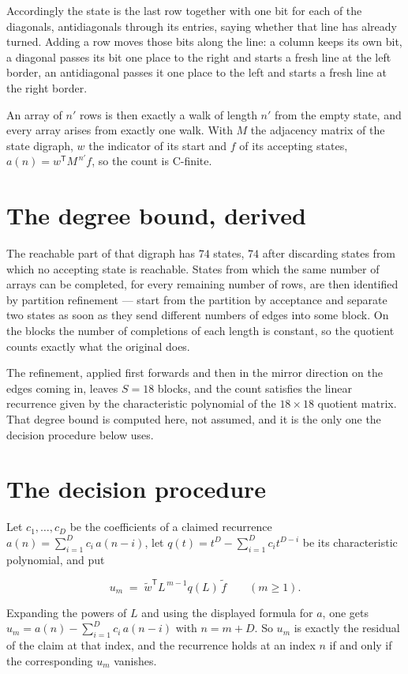 \documentclass[11pt]{article}
\theoremstyle{definition}
\begin{document}
Accordingly the state is the last row together with one bit for each of the diagonals, antidiagonals through its entries, saying whether that line has already turned. Adding a row moves those bits along the line: a column keeps its own bit, a diagonal passes its bit one place to the right and starts a fresh line at the left border, an antidiagonal passes it one place to the left and starts a fresh line at the right border.

An array of $n'$ rows is then exactly a walk of length $n'$ from the empty state, and every array arises from exactly one walk. With $M$ the adjacency matrix of the state digraph, $w$ the indicator of its start and $f$ of its accepting states, $a(n) = w^{\mathsf T}M^{\,n'}f$, so the count is C-finite.

\section{The degree bound, derived}

The reachable part of that digraph has $74$ states, $74$ after discarding states from which no accepting state is reachable. States from which the same number of arrays can be completed, for every remaining number of rows, are then identified by partition refinement --- start from the partition by acceptance and separate two states as soon as they send different numbers of edges into some block. On the blocks the number of completions of each length is constant, so the quotient counts exactly what the original does.

The refinement, applied first forwards and then in the mirror direction on the edges coming in, leaves $S = 18$ blocks, and the count satisfies the linear recurrence given by the characteristic polynomial of the $18 \times 18$ quotient matrix. That degree bound is computed here, not assumed, and it is the only one the decision procedure below uses.

\section{The decision procedure}

Let $c_1,\dots,c_D$ be the coefficients of a claimed recurrence $a(n) = \sum_{i=1}^{D} c_i\,a(n-i)$, let $q(t) = t^{D} - \sum_{i=1}^{D} c_i t^{D-i}$ be its characteristic polynomial, and put

\[u_m \;=\; \tilde w^{\mathsf T} L^{\,m-1} q(L)\,\tilde f \qquad (m \ge 1).\]

Expanding the powers of $L$ and using the displayed formula for $a$, one gets $u_m = a(n) - \sum_{i=1}^{D} c_i\,a(n-i)$ with $n = m + D$. So $u_m$ is exactly the residual of the claim at that index, and the recurrence holds at an index $n$ if and only if the corresponding $u_m$ vanishes.
\end{document}
